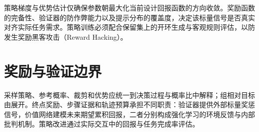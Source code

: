 \documentclass[../textbook.tex]{subfiles}
\begin{document}
\begin{note}[策略优化有效性与奖励函数规范性]
策略梯度与优势估计仅确保参数朝最大化当前设计回报函数的方向收敛。奖励函数的完备性、验证器的防作弊能力以及提示分布的覆盖度，决定该标量信号是否真实对齐实际任务需求。策略训练必须配合保留集上的开环生成与客观规则评估，以防发生奖励黑客攻击（Reward Hacking）。
\end{note}

\section{奖励与验证边界}

采样策略、参考概率、裁剪和优势应统一到决策过程与概率比中解释；组相对目标由展开。终点奖励、步骤证据和轨迹预算承担不同职责：验证器提供外部标量奖惩信号，价值网络建模未来期望累积回报，二者分别构成强化学习的环境反馈与内部批判机制。策略改进通过实际交互中的回报与任务完成率评估。




\chapterreferences
\myendchapterdocument
\end{document}
